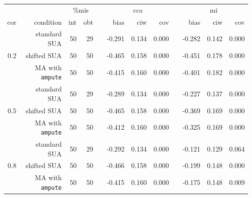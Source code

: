 \documentclass[11pt,a4paper]{article}
\newcommand{\code}[1]{\texttt{#1}}
\begin{document}
\begin{table}[h!]
\bigskip
\begin{subtable}{1\textwidth}
\vspace{3mm}
\centering
\captionsetup{justification=justified,singlelinecheck=false,width = 0.93\textwidth}
  \label{sim2b}
\begin{tabular}{rrrrrrrrrrrr}
\hline
&& \multicolumn{2}{c}{\%mis} && \multicolumn{3}{c}{cca} && \multicolumn{3}{c}{mi} \\
\cline{3-4} \cline{6-8} \cline{10-12}
cor & condition & int & obt & & bias & ciw & cov & & bias & ciw & cov \\ 
\hline
 & standard SUA & 50 & 29 &  & -0.291 & 0.134 & 0.000 &  & -0.282 & 0.142 & 0.000 \\ 
  0.2 & shifted SUA & 50 & 50 &  & -0.465 & 0.158 & 0.000 &  & -0.451 & 0.178 & 0.000 \\ 
   & MA with \code{ampute} & 50 & 50 &  & -0.415 & 0.160 & 0.000 &  & -0.401 & 0.182 & 0.000 \\ 
   \cline{2-12}
   & standard SUA & 50 & 29 &  & -0.289 & 0.134 & 0.000 &  & -0.227 & 0.137 & 0.000 \\ 
  0.5 & shifted SUA & 50 & 50 &  & -0.465 & 0.158 & 0.000 &  & -0.369 & 0.169 & 0.000 \\ 
   & MA with \code{ampute} & 50 & 50 &  & -0.412 & 0.160 & 0.000 &  & -0.325 & 0.169 & 0.000 \\ 
   \cline{2-12}
   & standard SUA & 50 & 29 &  & -0.292 & 0.134 & 0.000 &  & -0.121 & 0.129 & 0.064 \\ 
  0.8 & shifted SUA & 50 & 50 &  & -0.466 & 0.158 & 0.000 &  & -0.199 & 0.148 & 0.000 \\ 
   & MA with \code{ampute} & 50 & 50 &  & -0.415 & 0.160 & 0.000 &  & -0.175 & 0.148 & 0.009 \\ 
   \hline
\end{tabular}
\vspace{2mm}
\captionsetup{justification=justified,singlelinecheck=false,width = 0.93\textwidth}
  \end{subtable}

\end{table}
\end{document}
